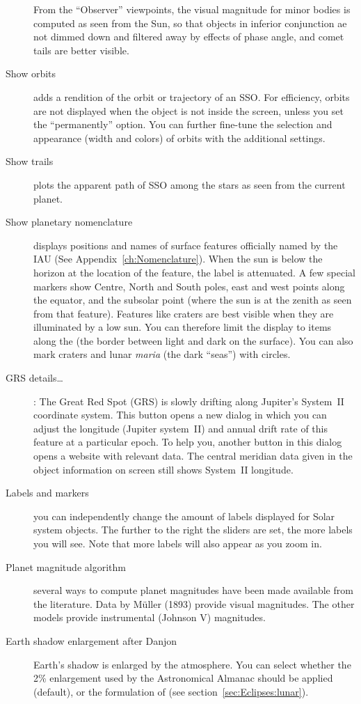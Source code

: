 \begin{description}
  From the ``Observer'' viewpoints, the visual magnitude for minor bodies is computed as seen from the Sun,
  so that objects in inferior conjunction ae not dimmed down and filtered away by effects of phase angle, 
  and comet tails are better visible. 
  
\item[Show orbits] adds a rendition of the orbit or trajectory of an SSO. 
For efficiency, orbits are not displayed when the object is not inside the screen, 
unless you set the ``permanently'' option. You can further fine-tune the selection 
and appearance (width and colors) of orbits with the additional settings. 
\item[Show trails] plots the apparent path of SSO among the stars as
  seen from the current planet.
\item[Show planetary nomenclature] displays positions and names of
  surface features officially named by the IAU (See
  Appendix~\ref{ch:Nomenclature}). When the sun is below the horizon
  at the location of the feature, the label is attenuated. A few special markers 
  show Centre, North and South poles, east and west points along the equator, 
  and the subsolar point (where the sun is at the zenith as seen from that feature). 
  Features like craters are best visible when they are illuminated by a low sun. 
  You can therefore limit the display to items along the
   (the border between light and dark on the surface).
  You can also mark craters and lunar \emph{maria} (the dark ``seas'') with circles. 
\item[GRS details\ldots]: The Great Red Spot (GRS) is slowly
  drifting along Jupiter's System~II coordinate system. This button 
  opens a new dialog in which you can adjust the longitude (Jupiter system~II) 
  and annual drift rate of this feature at a particular epoch. To help you,
  another button in this dialog opens a website with relevant data.
  The central meridian data given
   in the object information on screen still shows
  System~II longitude.
\item[Labels and markers] you can independently change the amount of
  labels displayed for Solar system objects. The further to the
  right the sliders are set, the more labels you will see. Note that
  more labels will also appear as you zoom in.
\item[Planet magnitude algorithm] several ways to compute planet
  magnitudes have been made available from the literature. Data by
  Müller (1893) provide visual magnitudes. The other models provide
  instrumental (Johnson V) magnitudes.
\item[Earth shadow enlargement after Danjon] 
  Earth's shadow is enlarged by the atmosphere. You can select whether
  the 2\% enlargement used by the Astronomical Almanac should be
  applied (default), or the formulation of 
  (see section~\ref{sec:Eclipses:lunar}).
\end{description}

